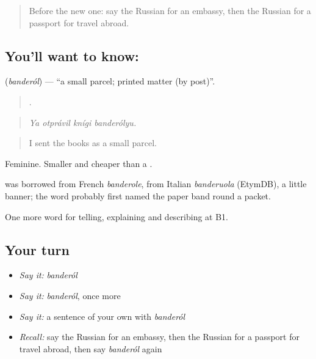 \label{lesson:RU-C451-banderol}



\begin{quote}
Before the new one: say the Russian for an embassy, then the Russian for a passport for travel abroad.
\end{quote}

\subsection*{You'll want to know: }
\textbf{} (\emph{banderól}) — \textquotedblleft{}a small parcel; printed matter (by post)\textquotedblright{}.

\begin{quote}
   .
\end{quote}

\begin{quote}
\emph{Ya otprávil knígi banderólyu.}
\end{quote}

\begin{quote}
I sent the books as a small parcel.
\end{quote}

Feminine. Smaller and cheaper than a \emph{}.

\begin{cousinweb}
\emph{} was borrowed from French \emph{banderole}, from Italian \emph{banderuola} (EtymDB), a little banner; the word probably first named the paper band round a packet.
\end{cousinweb}

\begin{grammarlens}[title={What you've built}]
One more word for telling, explaining and describing at B1.
\end{grammarlens}

\subsection*{Your turn}
\begin{itemize}
\raggedright
  \item \emph{Say it:} \emph{banderól}
  \item \emph{Say it:} \emph{banderól}, once more
  \item \emph{Say it:} a sentence of your own with \emph{banderól}
  \item \emph{Recall:} say the Russian for an embassy, then the Russian for a passport for travel abroad, then say \emph{banderól} again
\end{itemize}

